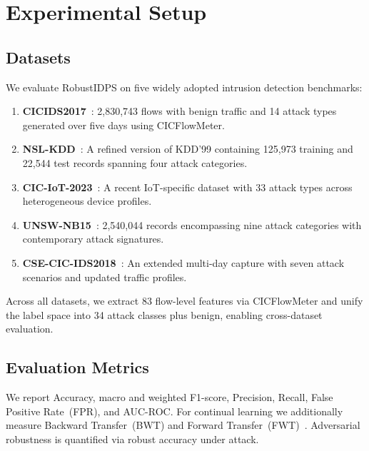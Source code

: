 
\section{Experimental Setup}
\label{sec:experimental_setup}

\subsection{Datasets}
We evaluate RobustIDPS on five widely adopted intrusion detection benchmarks:

\begin{enumerate}
    \item \textbf{CICIDS2017}~\cite{Sharafaldin2018}: 2,830,743 flows with benign traffic and 14 attack types generated over five days using CICFlowMeter.
    \item \textbf{NSL-KDD}~\cite{Tavallaee2009}: A refined version of KDD'99 containing 125,973 training and 22,544 test records spanning four attack categories.
    \item \textbf{CIC-IoT-2023}~\cite{Neto2023}: A recent IoT-specific dataset with 33 attack types across heterogeneous device profiles.
    \item \textbf{UNSW-NB15}~\cite{Moustafa2015}: 2,540,044 records encompassing nine attack categories with contemporary attack signatures.
    \item \textbf{CSE-CIC-IDS2018}~\cite{CSEIDS2018}: An extended multi-day capture with seven attack scenarios and updated traffic profiles.
\end{enumerate}

Across all datasets, we extract 83 flow-level features via CICFlowMeter and unify the label space into 34 attack classes plus benign, enabling cross-dataset evaluation.

\subsection{Evaluation Metrics}
We report Accuracy, macro and weighted F1-score, Precision, Recall, False Positive Rate~(FPR), and AUC-ROC. For continual learning we additionally measure Backward Transfer~(BWT) and Forward Transfer~(FWT)~\cite{Lopez-Paz2017}. Adversarial robustness is quantified via robust accuracy under attack.

